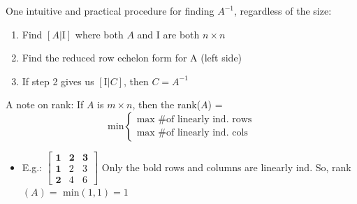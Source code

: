 \noindent One intuitive and practical procedure for finding $A^{-1}$, regardless of the size:

\begin{enumerate}
    \item Find $[A|\text{I}]$ where both $A$ and I are both $n \times n$
    \item Find the reduced row echelon form for A (left side)
    \item If step 2 gives us $[\text{I}|C]$, then $C = A^{-1}$
\end{enumerate}

\noindent A note on rank: If $A$ is $m \times n$, then the rank($A$) = 
\[ \text{min} \begin{cases} 
    \text{max \# of linearly ind. rows} \\
    \text{max \# of linearly ind. cols} 
\end{cases}
\]

\begin{itemize}
    \item E.g.: 
    $\begin{bmatrix}
        \bm{1} & \bm{2} & \bm{3} \\
        \bm{1} & 2 & 3 \\
        \bm{2} & 4 & 6
    \end{bmatrix}$ Only the bold rows and columns are linearly ind. So, rank$(A) =$ min$(1,1) = 1$
\end{itemize}

